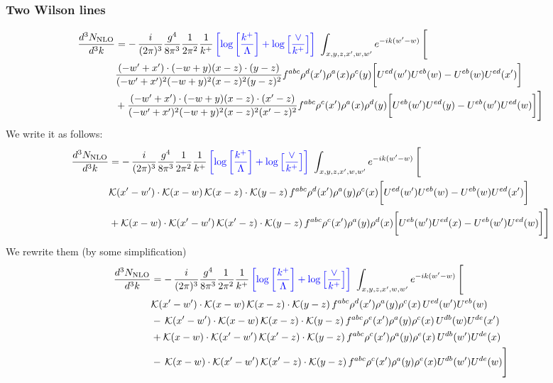 \documentclass[aps,prd,amsmath,amssymb,nofootinbib]{revtex4-2}
\numberwithin{equation}{section}
\begin{document}
\subsubsection{Two Wilson lines}
\begin{align}
    \frac{d^{3}N_{\rm NLO}}{d^{3}k} & = -\,\frac{i}{(2\pi)^{3}}\frac{g^{4}}{8\pi^{3}}\frac{1}{2\pi^{2}} \frac{1}{k^{+}}\,{\color{blue}\left[\log{\left[\frac{k^{+}}{\Lambda}\right]}+\log{\left[\frac{\vee}{k^{+}}\right]}\right]}\,\,\int_{x,y,z,x^{\prime},w,w^{\prime}}e^{-ik(w^{\prime}-w)}\, \Bigg[\notag \\ &  \frac{( - w' + x') \cdot ( - w + y) (x - z) \cdot (y - z)}{( - w' + x')^{2} ( - w + y)^{2} (x - z)^{2} (y - z)^{2}} f^{a b c} \rho^{d}(x') \rho^{a}(x) \rho^{c}(y) \bigg[U^{ed}(w') U^{e b}(w) - U^{e b}(w) U^{e d}(x')\bigg]\nonumber\\
    & + \frac{( - w' + x') \cdot ( - w + y) (x - z) \cdot (x' - z)}{( - w' + x')^{2} ( - w + y)^{2} (x - z)^{2} (x' - z)^{2}} f^{a b c} \rho^{c}(x') \rho^{a}(x) \rho^{d}(y) \bigg[U^{e b}(w') U^{e d}(y) - U^{eb}(w') U^{e d}(w) \bigg]\Bigg]
\end{align}
We write it as follows:
\begin{align}
    \frac{d^{3}N_{\rm NLO}}{d^{3}k} & = -\,\frac{i}{(2\pi)^{3}}\frac{g^{4}}{8\pi^{3}}\frac{1}{2\pi^{2}} \frac{1}{k^{+}}\,{\color{blue}\left[\log{\left[\frac{k^{+}}{\Lambda}\right]}+\log{\left[\frac{\vee}{k^{+}}\right]}\right]}\,\,\int_{x,y,z,x^{\prime},w,w^{\prime}}e^{-ik(w^{\prime}-w)}\, \Bigg[\notag \\ &  \mathcal{K}(x'-w')\cdot \mathcal{K}(x-w)\, \mathcal{K}(x-z)\cdot \mathcal{K}(y-z)\, f^{a b c} \rho^{d}(x') \rho^{a}(y) \rho^{c}(x) \bigg[U^{ed}(w') U^{e b}(w) - U^{e b}(w) U^{e d}(x')\bigg]\nonumber\\
    & + \mathcal{K}(x-w)\cdot \mathcal{K}(x'-w')\, \mathcal{K}(x'-z)\cdot \mathcal{K}(y-z)\, f^{a b c} \rho^{c}(x') \rho^{a}(y) \rho^{d}(x) \bigg[U^{e b}(w') U^{e d}(x) - U^{eb}(w') U^{e d}(w) \bigg]\Bigg]
\end{align}
We rewrite them (by some simplification)
\begin{align}
    \frac{d^{3}N_{\rm NLO}}{d^{3}k} & = -\,\frac{i}{(2\pi)^{3}}\frac{g^{4}}{8\pi^{3}}\frac{1}{2\pi^{2}} \frac{1}{k^{+}}\,{\color{blue}\left[\log{\left[\frac{k^{+}}{\Lambda}\right]}+\log{\left[\frac{\vee}{k^{+}}\right]}\right]}\,\,\int_{x,y,z,x^{\prime},w,w^{\prime}}e^{-ik(w^{\prime}-w)}\, \Bigg[\notag \\ &  \mathcal{K}(x'-w')\cdot \mathcal{K}(x-w)\, \mathcal{K}(x-z)\cdot \mathcal{K}(y-z)\, f^{a b c} \rho^{d}(x') \rho^{a}(y) \rho^{c}(x)\,U^{ed}(w') U^{e b}(w) \nonumber\\
    &  -\,\mathcal{K}(x'-w')\cdot \mathcal{K}(x-w)\, \mathcal{K}(x-z)\cdot \mathcal{K}(y-z)\, f^{a b c} \rho^{e}(x') \rho^{a}(y) \rho^{c}(x)\, U^{d b}(w) U^{de}(x')\nonumber\\
    & + \mathcal{K}(x-w)\cdot \mathcal{K}(x'-w')\, \mathcal{K}(x'-z)\cdot \mathcal{K}(y-z)\, f^{a b c} \rho^{c}(x') \rho^{a}(y) \rho^{e}(x)\,U^{d b}(w') U^{de}(x) \nonumber\\
    & -\,\mathcal{K}(x-w)\cdot \mathcal{K}(x'-w')\, \mathcal{K}(x'-z)\cdot \mathcal{K}(y-z)\, f^{a b c} \rho^{c}(x') \rho^{a}(y) \rho^{e}(x) U^{db}(w') U^{de}(w)\Bigg]
\end{align}
\end{document}
